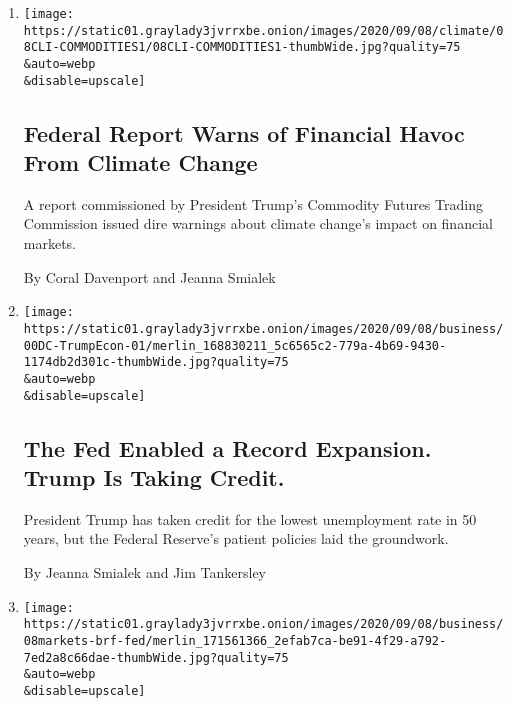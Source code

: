 \begin{enumerate}
\def\labelenumi{\arabic{enumi}.}
\item
  \href{/2020/09/08/climate/climate-change-financial-markets.html}{}

  \texttt{[image: https://static01.graylady3jvrrxbe.onion/images/2020/09/08/climate/08CLI-COMMODITIES1/08CLI-COMMODITIES1-thumbWide.jpg?quality=75\\\&auto=webp\\\&disable=upscale]}

  \hypertarget{federal-report-warns-of-financial-havoc-from-climate-change}{%
  \subsection{Federal Report Warns of Financial Havoc From Climate
  Change}\label{federal-report-warns-of-financial-havoc-from-climate-change}}

  A report commissioned by President Trump's Commodity Futures Trading
  Commission issued dire warnings about climate change's impact on
  financial markets.

  By Coral Davenport and Jeanna Smialek
\item
  \href{/2020/09/08/business/economy/trump-economy-fed.html}{}

  \texttt{[image: https://static01.graylady3jvrrxbe.onion/images/2020/09/08/business/00DC-TrumpEcon-01/merlin\_168830211\_5c6565c2-779a-4b69-9430-1174db2d301c-thumbWide.jpg?quality=75\\\&auto=webp\\\&disable=upscale]}

  \hypertarget{the-fed-enabled-a-record-expansion-trump-is-taking-credit}{%
  \subsection{The Fed Enabled a Record Expansion. Trump Is Taking
  Credit.}\label{the-fed-enabled-a-record-expansion-trump-is-taking-credit}}

  President Trump has taken credit for the lowest unemployment rate in
  50 years, but the Federal Reserve's patient policies laid the
  groundwork.

  By Jeanna Smialek and Jim Tankersley
\item
  \href{/live/2020/09/08/business/stock-market-today-coronavirus/fed-report-shows-loans-are-going-to-a-wide-variety-of-companies}{}

  \texttt{[image: https://static01.graylady3jvrrxbe.onion/images/2020/09/08/business/08markets-brf-fed/merlin\_171561366\_2efab7ca-be91-4f29-a792-7ed2a8c66dae-thumbWide.jpg?quality=75\\\&auto=webp\\\&disable=upscale]}


\end{enumerate}
